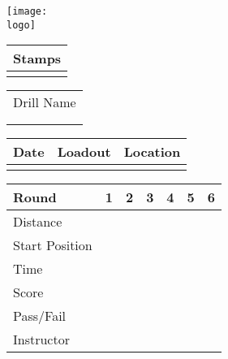 \documentclass[../Cover.tex]{subfiles}
\begin{document}
\begin{minipage}[t]{0.15\textwidth} 
	\texttt{[image: \\logo]}
	\begin{tabular}{p{}|}
		Stamps \\
		\hline
		\\[5.5cm]
	\end{tabular}
\end{minipage}
\hfill
\begin{minipage}[t]{0.85\textwidth}

	\begin{minipage}[t]{3cm}
		\begin{tabular}{ p{3cm} }			
			\large Drill Name\\[0.5cm]
			\\
			\hline
			\\	
		\end{tabular}
	\end{minipage}
	\hfill
	\begin{minipage}[t]{0.3\textwidth}
		\begin{tabular}{ | p{1.5cm} | p{1.5cm} | p{1.5cm} |}
			\hline
			Date & Loadout & Location\\ 
			\hline
			&  &  \\ 
			\hline
		\end{tabular}
	\end{minipage}
	\begin{tabular}{ | p{1.5cm} | p{1cm} | p{.5cm} | p{.5cm} | p{.5cm} | p{.5cm} | p{.5cm} |}
		\hline
		Round & 1 & 2 & 3 & 4 & 5 & 6 \\ 
		\hline
		\tiny Distance & & & & & & \\ 		
		\hline
		\tiny Start Position & & & & & & \\
		\hline
		\tiny Time & & & & & & \\
		\hline
		\tiny Score & & & & & & \\
		\hline
		\tiny Pass/Fail & & & & & & \\
		\hline
		\tiny Instructor & & & & & & \\
		\hline
	\end{tabular}
\end{minipage}
\end{document}

